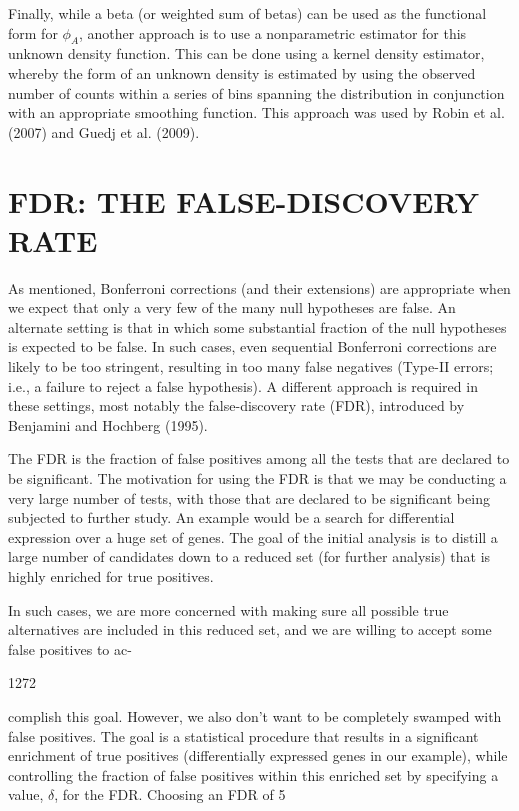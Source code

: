 \documentclass{article}
\begin{document}
Finally, while a beta (or weighted sum of betas) can be used as the functional form for  $ \phi_{A} $, another approach is to use a nonparametric estimator for this unknown density function. This can be done using a kernel density estimator, whereby the form of an unknown density is estimated by using the observed number of counts within a series of bins spanning the distribution in conjunction with an appropriate smoothing function. This approach was used by Robin et al. (2007) and Guedj et al. (2009).

\section{FDR: THE FALSE-DISCOVERY RATE}
As mentioned, Bonferroni corrections (and their extensions) are appropriate when we expect that only a very few of the many null hypotheses are false. An alternate setting is that in which some substantial fraction of the null hypotheses is expected to be false. In such cases, even sequential Bonferroni corrections are likely to be too stringent, resulting in too many false negatives (Type-II errors; i.e., a failure to reject a false hypothesis). A different approach is required in these settings, most notably the false-discovery rate (FDR), introduced by Benjamini and Hochberg (1995).

The FDR is the fraction of false positives among all the tests that are declared to be significant. The motivation for using the FDR is that we may be conducting a very large number of tests, with those that are declared to be significant being subjected to further study. An example would be a search for differential expression over a huge set of genes. The goal of the initial analysis is to distill a large number of candidates down to a reduced set (for further analysis) that is highly enriched for true positives.

In such cases, we are more concerned with making sure all possible true alternatives are included in this reduced set, and we are willing to accept some false positives to ac-

1272

complish this goal. However, we also don't want to be completely swamped with false positives. The goal is a statistical procedure that results in a significant enrichment of true positives (differentially expressed genes in our example), while controlling the fraction of false positives within this enriched set by specifying a value,  $ \delta $, for the FDR. Choosing an FDR of 5%
\end{document}
